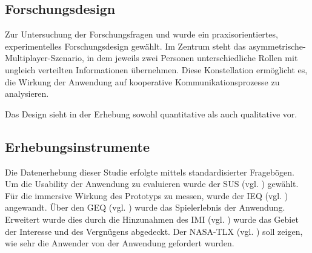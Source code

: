 \subsection{Forschungsdesign}
Zur Untersuchung der Forschungsfragen  und  wurde ein praxisorientiertes, experimentelles Forschungsdesign gewählt. Im Zentrum steht das asymmetrische-Multiplayer-Szenario, in dem jeweils zwei Personen unterschiedliche Rollen mit ungleich verteilten Informationen übernehmen. Diese Konstellation ermöglicht es, die Wirkung der Anwendung auf kooperative Kommunikationsprozesse zu analysieren.

Das Design sieht in der Erhebung sowohl quantitative als auch qualitative vor. 

\subsection{Erhebungsinstrumente}

Die Datenerhebung dieser Studie erfolgte mittels standardisierter Fragebögen.
Um die Usability der Anwendung zu evaluieren wurde der \ac{SUS} (vgl. \cite{brooke_sus_1995}) gewählt. Für die immersive Wirkung des Prototyps zu messen, wurde der \ac{IEQ} (vgl. \cite{jennett_measuring_2008}) angewandt. Über den \ac{GEQ} (vgl. \cite{ijsselsteijn_game_2013}) wurde das Spielerlebnis der Anwendung. Erweitert wurde dies durch die Hinzunahmen des \ac{IMI} (vgl. \cite{mcauley_psychometric_1989}) wurde das Gebiet der Interesse und des Vergnügens abgedeckt. Der \ac{NASA-TLX} (vgl. \cite{hart_nasa-task_2006}) soll zeigen, wie sehr die Anwender von der Anwendung gefordert wurden.


